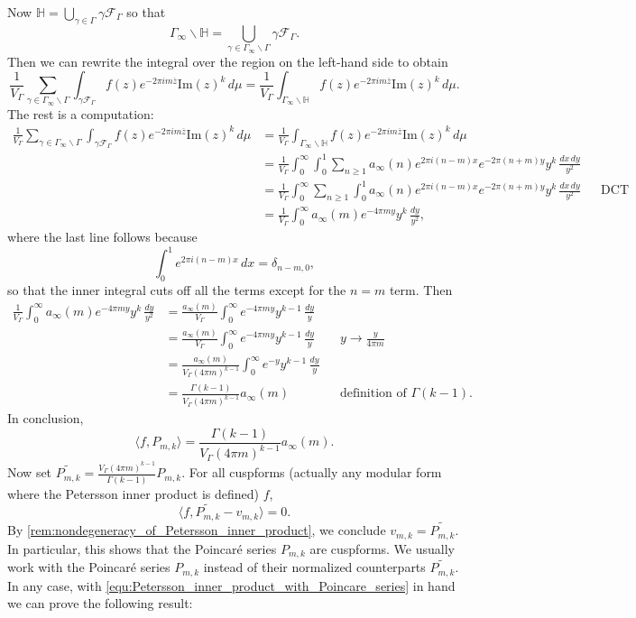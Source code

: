 \documentclass[12pt]{book}
\theoremstyle{definition}\newframedtheorem{method}{Method}
\newcommand{\mc}{\mathcal}
\renewcommand{\H}{\mathbb{H}}
\newcommand{\g}{\gamma}
\renewcommand{\d}{\delta}
\newcommand{\G}{\Gamma}
\newcommand{\<}{\langle}
\renewcommand{\>}{\rangle}
\newcommand{\wtilde}{\widetilde}
\newcommand{\conj}{\overline}
\renewcommand{\Im}{\mathrm{Im}}
\newcommand{\GG}{\G_{\infty}\backslash\G}
\begin{document}
      Now $\H = \bigcup_{\g \in \G}\g\mc{F}_{\G}$ so that
      \[
        \G_{\infty}\backslash\H = \bigcup_{\g \in \GG}\g\mc{F}_{\G}.
      \]
      Then we can rewrite the integral over the region on the left-hand side to obtain
      \[
        \frac{1}{V_{\G}}\sum_{\g \in \GG}\int_{\g\mc{F}_{\G}}f(z)e^{-2\pi im\conj{z}}\Im(z)^{k}\,d\mu = \frac{1}{V_{\G}}\int_{\G_{\infty}\backslash\H}f(z)e^{-2\pi im\conj{z}}\Im(z)^{k}\,d\mu.
      \]
      The rest is a computation:
      \begin{align*}
        \frac{1}{V_{\G}}\sum_{\g \in \GG}\int_{\g\mc{F}_{\G}}f(z)e^{-2\pi im\conj{z}}\Im(z)^{k}\,d\mu &= \frac{1}{V_{\G}}\int_{\G_{\infty}\backslash\H}f(z)e^{-2\pi im\conj{z}}\Im(z)^{k}\,d\mu \\
        &= \frac{1}{V_{\G}}\int_{0}^{\infty}\int_{0}^{1}\sum_{n \ge 1}a_{\infty}(n)e^{2\pi i(n-m)x}e^{-2\pi(n+m)y}y^{k}\,\frac{dx\,dy}{y^{2}} \\
        &= \frac{1}{V_{\G}}\int_{0}^{\infty}\sum_{n \ge 1}\int_{0}^{1}a_{\infty}(n)e^{2\pi i(n-m)x}e^{-2\pi(n+m)y}y^{k}\,\frac{dx\,dy}{y^{2}} && \text{DCT} \\
        &= \frac{1}{V_{\G}}\int_{0}^{\infty}a_{\infty}(m)e^{-4\pi my}y^{k}\,\frac{dy}{y^{2}},
      \end{align*}
      where the last line follows because
      \begin{equation}\label{equ:Dirac_integral_representation}
        \int_{0}^{1}e^{2\pi i(n-m)x}\,dx = \d_{n-m,0},
      \end{equation}
      so that the inner integral cuts off all the terms except for the $n = m$ term. Then
      \begin{align*}
        \frac{1}{V_{\G}}\int_{0}^{\infty}a_{\infty}(m)e^{-4\pi my}y^{k}\,\frac{dy}{y^{2}} &= \frac{a_{\infty}(m)}{V_{\G}}\int_{0}^{\infty}e^{-4\pi my}y^{k-1}\,\frac{dy}{y} \\
        &= \frac{a_{\infty}(m)}{V_{\G}}\int_{0}^{\infty}e^{-4\pi my}y^{k-1}\,\frac{dy}{y} && \text{$y \to \frac{y}{4\pi m}$} \\
        &= \frac{a_{\infty}(m)}{V_{\G}(4\pi m)^{k-1}}\int_{0}^{\infty}e^{-y}y^{k-1}\,\frac{dy}{y} \\
        &= \frac{\G(k-1)}{V_{\G}(4\pi m)^{k-1}}a_{\infty}(m) && \text{definition of $\G(k-1)$.}
      \end{align*}
      In conclusion,
      \begin{equation}\label{equ:Petersson_inner_product_with_Poincare_series}
        \<f,P_{m,k}\> = \frac{\G(k-1)}{V_{\G}(4\pi m)^{k-1}}a_{\infty}(m).
      \end{equation}
      Now set $\wtilde{P_{m,k}} = \frac{V_{\G}(4\pi m)^{k-1}}{\G(k-1)}P_{m,k}$. For all cuspforms (actually any modular form where the Petersson inner product is defined) $f$,
      \[
        \<f,\wtilde{P_{m,k}}-v_{m,k}\> = 0.
      \]
      By \cref{rem:nondegeneracy_of_Petersson_inner_product}, we conclude $v_{m,k} = \wtilde{P_{m,k}}$. In particular, this shows that the Poincar\'e series $P_{m,k}$ are cuspforms. We usually work with the Poincar\'e series $P_{m,k}$ instead of their normalized counterparts $\wtilde{P_{m,k}}$. In any case, with \cref{equ:Petersson_inner_product_with_Poincare_series} in hand we can prove the following result:
\end{document}
